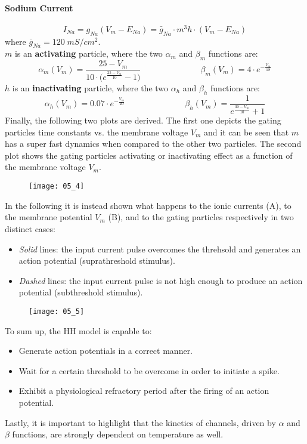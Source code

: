 \paragraph{Sodium Current}
\begin{equation*}
    I_{Na}=g_{Na}(V_{m}-E_{Na})=\bar{g}_{Na}\cdot{m^{3}h}\cdot{(V_{m}-E_{Na})}
\end{equation*}
where \(\bar{g}_{Na}=120\;mS/cm^{2}\).\\
\(m\) is an \textbf{activating} particle, where the two \(\alpha_{m}\) and \(\beta_{m}\)
functions are:
\begin{equation*}
    \alpha_{m}(V_{m})=\frac{25-V_{m}}{10\cdot\bigl(e^{\frac{25-V_{m}}{10}}-1\bigr)}
    \hspace{3cm}
    \beta_{m}(V_{m})=4\cdot{e^{-\frac{V_{m}}{18}}}
\end{equation*}
\(h\) is an \textbf{inactivating} particle, where the two \(\alpha_{h}\) and \(\beta_{h}\)
functions are:
\begin{equation*}
    \alpha_{h}(V_{m})=0.07\cdot{e^{-\frac{V_{m}}{20}}}
    \hspace{3cm}
    \beta_{h}(V_{m})=\frac{1}{e^{\frac{30-V_{m}}{10}}+1}
\end{equation*}
Finally, the following two plots are derived. The first one depicts the gating particles
time constants vs. the membrane voltage \(V_{m}\) and it can be seen that \(m\) has a
super fast dynamics when compared to the other two particles. The second plot shows
the gating particles activating or inactivating effect as a function of the membrane
voltage \(V_{m}\).
\begin{figure}[H]
    \texttt{[image: 05\_4]}
    \centering
\end{figure}
In the following it is instead shown what happens to the ionic currents (A), to the
membrane potential \(V_{m}\) (B), and to the gating particles respectively in two distinct
cases:
\begin{itemize}
    \item \textit{Solid} lines: the input current pulse overcomes the threhsold and generates
          an action potential (suprathreshold stimulus).
    \item \textit{Dashed} lines: the input current pulse is not high enough to produce an
          action potential (subthreshold stimulus).
\end{itemize}
\begin{figure}[H]
    \texttt{[image: 05\_5]}
    \centering
\end{figure}
To sum up, the HH model is capable to:
\begin{itemize}
    \item Generate action potentials in a correct manner.
    \item Wait for a certain threshold to be overcome in order to initiate a spike.
    \item Exhibit a physiological refractory period after the firing of an action potential.
\end{itemize}
Lastly, it is important to highlight that the kinetics of channels, driven by \(\alpha\) and
\(\beta\) functions, are strongly dependent on temperature as well.

